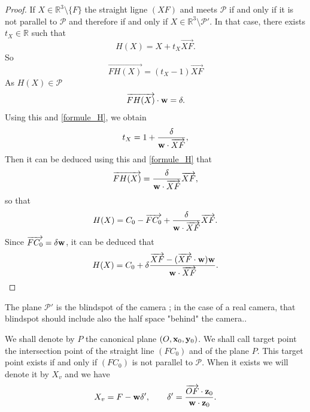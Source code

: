 \begin{proof}
If $X\in \mathbb{R}^3 \setminus \{F\}$ the straight ligne $(XF)$ and meets $\mathcal{P}$ if and only if it is not parallel to  $\mathcal{P}$ and therefore if and only if $X\in \mathbb{R}^3 \setminus \mathcal{P}'$. In that case, there exists $t_X\in \mathbb{R}$ such that
\begin{equation}
H(X)=X+t_{X}\overrightarrow{XF}.
\end{equation}
So
\begin{equation}
\overrightarrow{FH(X)} = (t_X-1)\overrightarrow{XF}
\label{formule_H}
\end{equation}
As $H(X)\in \mathcal{P}$
\begin{equation*}
\overrightarrow{FH(X)}\cdot \mathbf{w} =\delta.
\end{equation*}
Using this and \eqref{formule_H}, we obtain 
\begin{equation*}
t_{X}=1+\frac{\delta}{\mathbf{w} \cdot \overrightarrow{XF}},
\end{equation*}
 Then it can be deduced using this and \eqref{formule_H} that
 \begin{equation*}
 \overrightarrow{FH(X)}=\frac{\delta}{\mathbf{w} \cdot \overrightarrow{XF}}\overrightarrow{XF},
 \end{equation*}
 so that
 \begin{equation*}
 H(X)=C_0-\overrightarrow{FC_0}+\frac{\delta}{\mathbf{w} \cdot \overrightarrow{XF}}\overrightarrow{XF}.
 \end{equation*}
 Since $\overrightarrow{FC_0}=\delta\mathbf{w}$, it can be deduced that
\begin{equation*}
H(X) = C_0 +  \delta \frac{\overrightarrow{XF}-(\overrightarrow{XF}\cdot \mathbf{w} )\mathbf{w}}{\mathbf{w} \cdot \overrightarrow{XF}}.
\end{equation*}
\end{proof}


\begin{remarque}
The plane $\mathcal{P}'$ is the blindspot of the camera ; in the case of a real camera, that blindspot should include also the half space "behind" the camera..
\end{remarque}


\begin{Def} 
We shall denote by $P$ the canonical plane $(O,\mathbf{x}_0,\mathbf{y}_0)$.
We shall call target point the intersection point of the straight line $(FC_0)$ and of the plane $P$. This target point exists if and only if $(FC_0)$ is not parallel to $\mathcal{P}$. When it exists we will denote it by $X_v$ and we have
\begin{equation*}
X_v=F-\mathbf{w} \delta',~~~~~~\delta'=\frac{\overrightarrow{OF}\cdot \mathbf{z}_0}{\mathbf{w} \cdot \mathbf{z}_0}.
\label{formule_point_vise}
\end{equation*}
\label{point_vise}
\end{Def}


